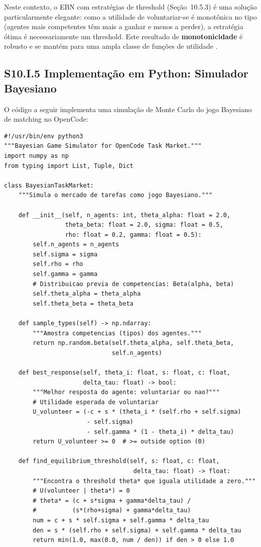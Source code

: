 Neste contexto, o EBN com estratégias de threshold (Seção~10.5.3) é uma solução particularmente elegante: como a utilidade de voluntariar-se é monotônica no tipo (agentes mais competentes têm mais a ganhar e menos a perder), a estratégia ótima é necessariamente um threshold. Este resultado de \textbf{monotonicidade} é robusto e se mantém para uma ampla classe de funções de utilidade \cite{athey2001single}.

\subsection*{S10.I.5 Implementação em Python: Simulador Bayesiano}

O código a seguir implementa uma simulação de Monte Carlo do jogo Bayesiano de matching no OpenCode:

\begin{verbatim}
#!/usr/bin/env python3
"""Bayesian Game Simulator for OpenCode Task Market."""
import numpy as np
from typing import List, Tuple, Dict

class BayesianTaskMarket:
    """Simula o mercado de tarefas como jogo Bayesiano."""

    def __init__(self, n_agents: int, theta_alpha: float = 2.0,
                 theta_beta: float = 2.0, sigma: float = 0.5,
                 rho: float = 0.2, gamma: float = 0.5):
        self.n_agents = n_agents
        self.sigma = sigma
        self.rho = rho
        self.gamma = gamma
        # Distribuicao previa de competencias: Beta(alpha, beta)
        self.theta_alpha = theta_alpha
        self.theta_beta = theta_beta

    def sample_types(self) -> np.ndarray:
        """Amostra competencias (tipos) dos agentes."""
        return np.random.beta(self.theta_alpha, self.theta_beta,
                              self.n_agents)

    def best_response(self, theta_i: float, s: float, c: float,
                      delta_tau: float) -> bool:
        """Melhor resposta do agente: voluntariar ou nao?"""
        # Utilidade esperada de voluntariar
        U_volunteer = (-c + s * (theta_i * (self.rho + self.sigma)
                       - self.sigma)
                       - self.gamma * (1 - theta_i) * delta_tau)
        return U_volunteer >= 0  # >= outside option (0)

    def find_equilibrium_threshold(self, s: float, c: float,
                                    delta_tau: float) -> float:
        """Encontra o threshold theta* que iguala utilidade a zero."""
        # U(volunteer | theta*) = 0
        # theta* = (c + s*sigma + gamma*delta_tau) /
        #          (s*(rho+sigma) + gamma*delta_tau)
        num = c + s * self.sigma + self.gamma * delta_tau
        den = s * (self.rho + self.sigma) + self.gamma * delta_tau
        return min(1.0, max(0.0, num / den)) if den > 0 else 1.0


\end{verbatim}
